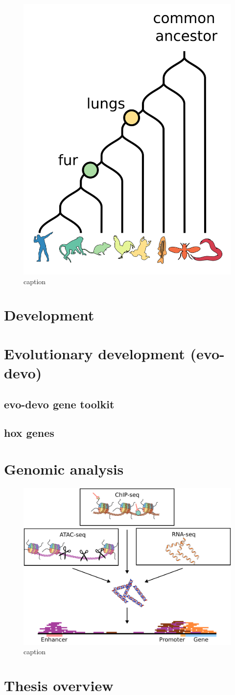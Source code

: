 \begin{figure}[H]
    \includegraphics[width=0.5\linewidth]{ch1.Introduction/imgs/phylogeny.png}
    \caption{caption}
    \label{fig:phlogeny}
\end{figure}

\section{Development}

\section{Evolutionary development (evo-devo)}
\subsection{evo-devo gene toolkit}
\subsection{hox genes}

\section{Genomic analysis}

\begin{figure}[H]
    \includegraphics[width=\linewidth]{ch1.Introduction/imgs/analysis.png}
    \caption{caption}
    \label{fig:phlogeny}
\end{figure}

\section{Thesis overview}
